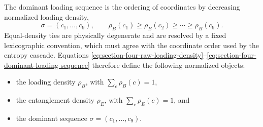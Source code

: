 \documentclass[11pt,letterpaper]{article}
\theoremstyle{plain}
\begin{document}
The dominant loading sequence is the ordering of coordinates by decreasing
normalized loading density,
\begin{equation}
\label{eq:section-four-dominant-loading-sequence}
 \sigma=(c_1,\ldots,c_9),
 \qquad
 \rho_B(c_1)\ge\rho_B(c_2)\ge\cdots\ge\rho_B(c_9).
\end{equation}
Equal-density ties are physically degenerate and are resolved by a fixed
lexicographic convention, which must agree with the coordinate order used by
the entropy cascade.  Equations
\eqref{eq:section-four-raw-loading-density}--\eqref{eq:section-four-dominant-loading-sequence}
therefore define the following normalized objects:
\begin{itemize}
\item the loading density \(\rho_B\), with \(\sum_c\rho_B(c)=1\),
\item the entanglement density \(\rho_E\), with \(\sum_c\rho_E(c)=1\), and
\item the dominant sequence \(\sigma=(c_1,\ldots,c_9)\).
\end{itemize}
\end{document}
